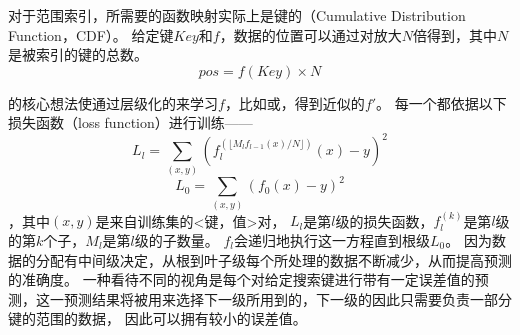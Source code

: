 
对于范围索引，所需要的函数映射实际上是键的{\cdf}（Cumulative Distribution Function，CDF）。
给定键$Key$和{\cdf}$f$，数据的位置可以通过对{\cdf}放大$N$倍得到，其中$N$是被索引的键的总数。
\[ pos=f(Key) \times N \]


{\rmi}的核心想法使通过层级化的{\model}来学习{\cdf}$f$，比如{\lr}或{\nn}，得到近似的{\cdf}$f'$。
每一个{\model}都依据以下损失函数（loss function）进行训练{------}
\[ L_l=\sum_{(x,y)}(f_l^{(\lfloor M_lf_{l-1}(x)/N\rfloor )}(x)-y)^2 \]
\[ L_0=\sum_{(x,y)}(f_0(x)-y)^2 \]
，其中$(x,y)$是来自训练集的<键，{\cdf}值>对，
$L_l$是第$l$级的损失函数，$f_l^{(k)}$是第$l$级的第$k$个子{\model}，$M_l$是第$l$级的子{\model}数量。
$f_l$会递归地执行这一方程直到根级$L_0$。
因为数据的分配有中间级{\model}决定，从根到叶子级每个{\model}所处理的数据不断减少，从而提高{\model}预测的准确度。
一种看待不同{\model}的视角是每个{\model}对给定搜索键进行带有一定误差值的预测，这一预测结果将被用来选择下一级所用到的{\model}，下一级的{\model}因此只需要负责一部分键的范围的数据，
因此可以拥有较小的误差值。

